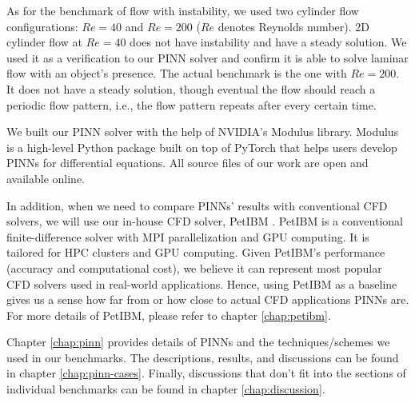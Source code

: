 As for the benchmark of flow with instability, we used two cylinder flow configurations: $Re=40$ and $Re=200$ ($Re$ denotes Reynolds number).
2D cylinder flow at $Re=40$ does not have instability and have a steady solution.
We used it as a verification to our PINN solver and confirm it is able to solve laminar flow with an object's presence.
The actual benchmark is the one with $Re=200$.
It does not have a steady solution, though eventual the flow should reach a periodic flow pattern, i.e., the flow pattern repeats after every certain time.

We built our PINN solver with the help of NVIDIA's Modulus library.
Modulus is a high-level Python package built on top of PyTorch that helps users develop PINNs for differential equations.
All source files of our work are open and available online.

In addition, when we need to compare PINNs' results with conventional CFD solvers, we will use our in-house CFD solver, PetIBM \cite{chuang_petibm:_2018}.
PetIBM is a conventional finite-difference solver with MPI parallelization and GPU computing.
It is tailored for HPC clusters and GPU computing.
Given PetIBM's performance (accuracy and computational cost), we believe it can represent most popular CFD solvers used in real-world applications.
Hence, using PetIBM as a baseline gives us a sense how far from or how close to actual CFD applications PINNs are.
For more details of PetIBM, please refer to chapter \ref{chap:petibm}.

Chapter \ref{chap:pinn} provides details of PINNs and the techniques/schemes we used in our benchmarks.
The descriptions, results, and discussions can be found in chapter \ref{chap:pinn-cases}.
Finally, discussions that don't fit into the sections of individual benchmarks can be found in chapter \ref{chap:discussion}.

